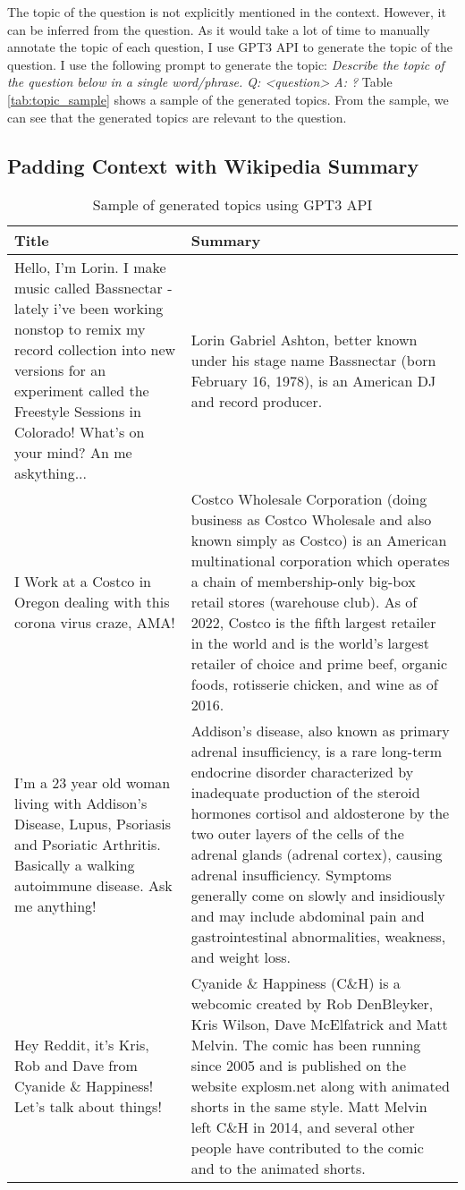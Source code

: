 \documentclass[paper=a4, fontsize=11pt]{scrartcl}
\numberwithin{equation}{section}		%
\numberwithin{figure}{section}			%
\numberwithin{table}{section}				%
\begin{document}
The topic of the question is not explicitly mentioned in the context.
However, it can be inferred from the question.
As it would take a lot of time to manually annotate the topic of each question, I use GPT3 API to generate the topic of the question.
I use the following prompt to generate the topic:
\textit{Describe the topic of the question below in a single word/phrase. Q: <question> A: ?}
Table \ref{tab:topic_sample} shows a sample of the generated topics.
From the sample, we can see that the generated topics are relevant to the question.


\subsection*{Padding Context with Wikipedia Summary}
\begin{table}
\centering
\tiny
\begin{tabular}{p{5cm}p{5cm}}
  \hline
  Title & Summary \\
  \hline
  \hline
  Hello, I'm Lorin. I make music called Bassnectar - lately i've been working nonstop to remix my record collection into new versions for an experiment called the Freestyle Sessions in Colorado! What's on your mind? An me askything... & Lorin Gabriel Ashton, better known under his stage name Bassnectar (born February 16, 1978), is an American DJ and record producer. \\
  \hline
  I Work at a Costco in Oregon dealing with this corona virus craze, AMA! & Costco Wholesale Corporation (doing business as Costco Wholesale and also known simply as Costco) is an American multinational corporation which operates a chain of membership-only big-box retail stores (warehouse club). As of 2022, Costco is the fifth largest retailer in the world and is the world's largest retailer of choice and prime beef, organic foods, rotisserie chicken, and wine as of 2016. \\
  \hline
  I’m a 23 year old woman living with Addison’s Disease, Lupus, Psoriasis and Psoriatic Arthritis. Basically a walking autoimmune disease. Ask me anything! & Addison's disease, also known as primary adrenal insufficiency, is a rare long-term endocrine disorder characterized by inadequate production of the steroid hormones cortisol and aldosterone by the two outer layers of the cells of the adrenal glands (adrenal cortex), causing adrenal insufficiency. Symptoms generally come on slowly and insidiously and may include abdominal pain and gastrointestinal abnormalities, weakness, and weight loss. \\
  \hline
  Hey Reddit, it’s Kris, Rob and Dave from Cyanide \& Happiness! Let’s talk about things! & Cyanide \& Happiness (C\&H) is a webcomic created by Rob DenBleyker, Kris Wilson, Dave McElfatrick and Matt Melvin. The comic has been running since 2005 and is published on the website explosm.net along with animated shorts in the same style. Matt Melvin left C\&H in 2014, and several other people have contributed to the comic and to the animated shorts.  \\
  \hline
  \hline
  \end{tabular}
  \caption{Sample of generated topics using GPT3 API}
  \label{tab:wiki_sample}
\end{table}
\end{document}
